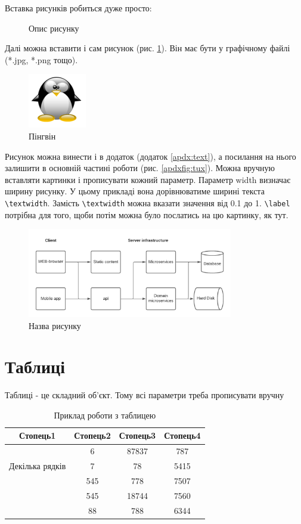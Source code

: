 Вставка рисунків робиться дуже просто:

\begin{figure}[h]
\caption{Опис рисунку}
\end{figure}

Далі можна вставити і сам рисунок (рис. \ref{fig:tux}). Він має бути у графічному файлі ({*}.jpg, {*}.png тощо). 

\begin{figure}[h]
 \centering\includegraphics{img/Tux.png}
 \caption{Пінгвін}
 \label{fig:tux}
\end{figure}

Рисунок можна винести і в додаток (додаток \ref{apdx:text}), \label{linkpage} а посилання на нього залишити в основній частині роботи (рис. \ref{apdxfig:tux}).
Можна вручную вставляти картинки і прописувати кожний параметр.
Параметр width визначає ширину рисунку. У цьому прикладі вона дорівнюватиме ширині текста \verb|\textwidth|. Замість \verb|\textwidth| можна вказати значення від 0.1 до 1. \verb|\label| потрібна для того, щоби потім можна було послатись на цю картинку, як тут.

\begin{figure}[!htb]
 \centering
 \includegraphics[width=0.8\textwidth]{img/fig1.png}
 \caption{Назва рисунку}
 \label{fig:fig1}
\end{figure}

\section{Таблиці}
Таблиці  - це складний об'єкт. Тому всі параметри треба прописувати вручну

\begin{table}[h!]
\centering
\begin{tabular}{|c|c|c|c|} 
 \hline
 Стопець1 & Стопець2 & Стопець3 & Стопець4 \\ [0.5ex] 
 \hline
 \multirow{3}{5em}{Декілька рядків} & 6 & 87837 & 787 \\ 
  &  7 & 78 & 5415 \\
   & 545 & 778 & 7507 \\
   & 545 & 18744 & 7560 \\
   & 88 & 788 & 6344 \\ [1ex] 
 \hline
\end{tabular}
\caption{Приклад роботи з таблицею}
\label{table:1}
\end{table}

